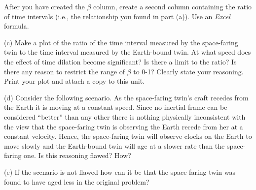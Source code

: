 After you have created the $\beta$ column, create a second
column containing the ratio of time intervals (i.e., the
relationship you found in part (a)).  Use an
\textit{Excel} formula.



(c) Make a plot of the ratio of the time interval measured by the
space-faring twin to the time interval measured by the Earth-bound
twin. At what 
speed does the effect of time dilation become significant? Is there
a limit to the ratio? Is there any reason to restrict the range of
\( \beta  \) to 0-1? Clearly state your reasoning. Print your plot
and attach a copy to this unit.
\vspace{10mm}

(d) Consider the following scenario. As the space-faring twin's craft
recedes from the Earth it is moving at a constant speed. Since no
inertial frame can be considered {}``better'' than any other there
is nothing physically inconsistent with the view that the space-faring
twin is observing the Earth recede from her at a constant velocity.
Hence, the space-faring twin will observe clocks on the Earth to move
slowly and the Earth-bound twin will age at a slower rate than the
space-faring one. Is this reasoning flawed? How? 
\vspace{15mm}

(e) If the scenario is not flawed how can it be that the space-faring
twin was found to have aged less in the original problem?
